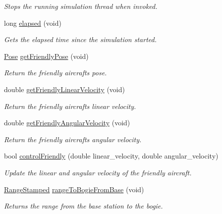 \begin{DoxyCompactItemize}
\begin{DoxyCompactList}\small\item\em Stops the running simulation thread when invoked. \end{DoxyCompactList}\item 
long \hyperlink{classSimulator_acd0a0ca3e9d25ea92ffc05e14b77c5e6}{elapsed} (void)
\begin{DoxyCompactList}\small\item\em Gets the elapsed time since the simulation started. \end{DoxyCompactList}\item 
\hyperlink{structPose}{Pose} \hyperlink{classSimulator_ab498029a37713969af417acfa7208d08}{get\+Friendly\+Pose} (void)
\begin{DoxyCompactList}\small\item\em Return the friendly aircraft\textquotesingle{}s pose. \end{DoxyCompactList}\item 
double \hyperlink{classSimulator_a17d07e629ef87450d91d960c2e6b231e}{get\+Friendly\+Linear\+Velocity} (void)
\begin{DoxyCompactList}\small\item\em Return the friendly aircraft\textquotesingle{}s linear velocity. \end{DoxyCompactList}\item 
double \hyperlink{classSimulator_a054241a50cbf232b71acdaf4290855d3}{get\+Friendly\+Angular\+Velocity} (void)
\begin{DoxyCompactList}\small\item\em Return the friendly aircraft\textquotesingle{}s angular velocity. \end{DoxyCompactList}\item 
bool \hyperlink{classSimulator_adb1cff57466c3b03fd738036cb9cee63}{control\+Friendly} (double linear\+\_\+velocity, double angular\+\_\+velocity)
\begin{DoxyCompactList}\small\item\em Update the linear and angular velocity of the friendly aircraft. \end{DoxyCompactList}\item 
\hyperlink{structRangeStamped}{Range\+Stamped} \hyperlink{classSimulator_abcd7cee64a0df0e4c5cbb3bbca719d16}{range\+To\+Bogie\+From\+Base} (void)
\begin{DoxyCompactList}\small\item\em Returns the range from the base station to the bogie. \end{DoxyCompactList}\item 

\end{DoxyCompactItemize}

